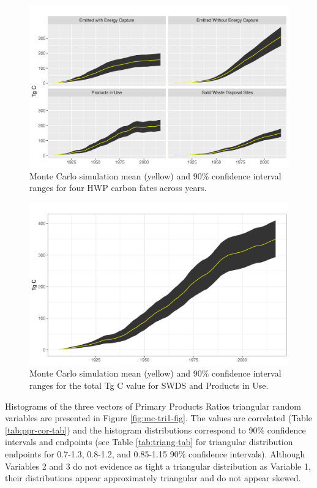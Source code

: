 \documentclass[
]{book}
\begin{document}
\begin{figure}
\includegraphics[width=1\linewidth]{images/MC_all4} \caption{Monte Carlo simulation mean (yellow) and 90\% confidence interval ranges for four HWP carbon fates across years.}\label{fig:mc-all4-fig}
\end{figure}

\begin{figure}
\includegraphics[width=1\linewidth]{images/MC_piu_swds} \caption{Monte Carlo simulation mean (yellow) and 90\% confidence interval ranges for the total Tg C value for SWDS and Products in Use.}\label{fig:mc-piu-swds-fig}
\end{figure}

Histograms of the three vectors of Primary Products Ratios triangular random variables are presented in Figure \ref{fig:mc-tri1-fig}. The values are correlated (Table \ref{tab:ppr-cor-tab}) and the histogram distributions correspond to 90\% confidence intervals and endpoints (see Table \ref{tab:triang-tab} for triangular distribution endpoints for 0.7-1.3, 0.8-1.2, and 0.85-1.15 90\% confidence intervals). Although Variables 2 and 3 do not evidence as tight a triangular distribution as Variable 1, their distributions appear approximately triangular and do not appear skewed.
\end{document}
